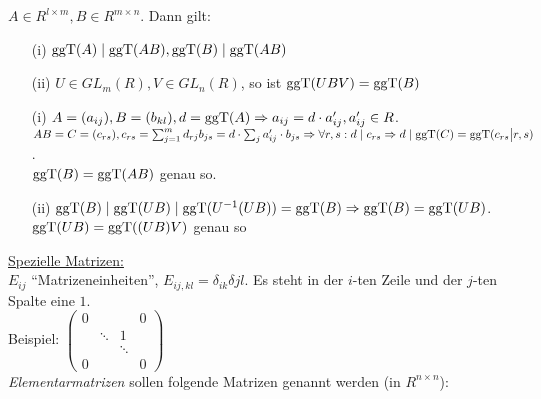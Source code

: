 \documentclass[a4paper,twoside,DIV15,BCOR12mm]{scrbook}
\begin{document}
\begin{lemma}
    $A \in R^{l \times m}, B \in R^{m \times n}$. Dann gilt:
    \begin{itemize}
        \item[(i)] $\mathop{\rm ggT}\nolimits(A) \mid \mathop{\rm ggT}\nolimits(AB), \mathop{\rm ggT}\nolimits(B) \mid \mathop{\rm ggT}\nolimits(AB)$
        \item[(ii)] $U \in GL_m(R), V \in GL_n(R)$, so ist $\mathop{\rm ggT}\nolimits(UBV) = \mathop{\rm ggT}\nolimits(B)$
    \end{itemize}
\end{lemma}
\begin{beweis}
    \begin{itemize}
        \item[(i)] $A = (a_{ij}), B = (b_{kl}), d = \mathop{\rm ggT}\nolimits(A) \Rightarrow a_{ij} = d \cdot a_{ij}', a_{ij}' \in R$. $AB = C = (c_{rs}), c_{rs} = \sum_{j = 1}^md_{rj}b_{js} = d \cdot \sum_ja_{ij}'\cdot b_{js} \Rightarrow \forall r,s: d \mid c_{rs} \Rightarrow d \mid \mathop{\rm ggT}\nolimits(C) = \mathop{\rm ggT}\nolimits(c_{rs} \big| r,s)$.\\
            $\mathop{\rm ggT}\nolimits(B) = \mathop{\rm ggT}\nolimits(AB)$ genau so.
        \item[(ii)] $\mathop{\rm ggT}\nolimits(B) \mid \mathop{\rm ggT}\nolimits(UB) \mid \mathop{\rm ggT}\nolimits(U^{-1}(UB)) = \mathop{\rm ggT}\nolimits(B) \Rightarrow \mathop{\rm ggT}\nolimits(B) = \mathop{\rm ggT}\nolimits(UB)$.\\
            $\mathop{\rm ggT}\nolimits(UB) = \mathop{\rm ggT}\nolimits((UB)V)$ genau so
    \end{itemize}
\end{beweis}
\underline{Spezielle Matrizen:}\\
$E_{ij}$ "`Matrizeneinheiten"', $E_{ij,kl} = \delta_{ik}\delta{jl}$. Es steht in der $i$-ten Zeile und der $j$-ten Spalte eine $1$.\\
Beispiel: $\begin{pmatrix}0 & & & 0\\
                            & \ddots & 1 \\
                            & & \ddots & \\
                          0 & & & 0\end{pmatrix}$\\
\emph{Elementarmatrizen} sollen folgende Matrizen genannt werden (in
$R^{n\times n}$):
\end{document}
